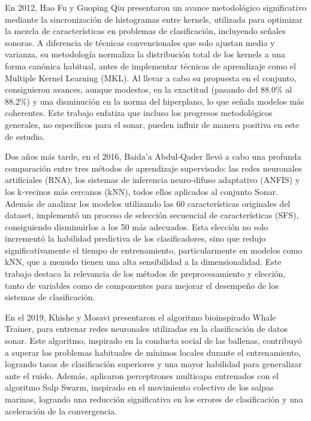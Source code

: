 \documentclass[a4paper,10pt]{article}
\begin{document}
En 2012, Hao Fu y Guoping Qiu presentaron un avance metodológico significativo mediante la sincronización de histogramas entre kernels, utilizada para optimizar la mezcla de características en problemas de clasificación, incluyendo señales sonoras. A diferencia de técnicas convencionales que solo ajustan media y varianza, su metodología normaliza la distribución total de los kernels a una forma canónica habitual, antes de implementar técnicas de aprendizaje como el Multiple Kernel Learning (MKL). Al llevar a cabo su propuesta en el conjunto, consiguieron avances, aunque modestos, en la exactitud (pasando del 88.0\% al 88.2\%) y una disminución en la norma del hiperplano, lo que señala modelos más coherentes. Este trabajo enfatiza que incluso los progresos metodológicos generales, no específicos para el sonar, pueden influir de manera positiva en este de estudio. \cite{fu2012}

\newpage
Dos años más tarde, en el 2016, Baida’a Abdul-Qader llevó a cabo una profunda comparación entre tres métodos de aprendizaje supervisado: las redes neuronales artificiales (RNA), los sistemas de inferencia neuro-difuso adaptativo (ANFIS) y los k-vecinos más cercanos (kNN), todos ellos aplicados al conjunto Sonar. Además de analizar los modelos utilizando las 60 características originales del dataset, implementó un proceso de selección secuencial de características (SFS), consiguiendo disminuirlos a los 50 más adecuados. Esta elección no solo incrementó la habilidad predictiva de los clasificadores, sino que redujo significativamente el tiempo de entrenamiento, particularmente en modelos como kNN, que a menudo tienen una alta sensibilidad a la dimensionalidad. Este trabajo destaca la relevancia de los métodos de preprocesamiento y elección, tanto de variables como de componentes para mejorar el desempeño de los sistemas de clasificación. \cite{abdulqader2016}

En el 2019, Khishe y Mosavi presentaron el algoritmo bioinspirado Whale Trainer, para entrenar redes neuronales utilizadas en la clasificación de datos sonar. Este algoritmo, inspirado en la conducta social de las ballenas, contribuyó a superar los problemas habituales de mínimos locales durante el entrenamiento, logrando tasas de clasificación superiores y una mayor habilidad para generalizar ante el ruido. Además, aplicaron perceptrones multicapa entrenados con el algoritmo Salp Swarm, inspirado en el movimiento colectivo de los salpas marinas, logrando una reducción significativa en los errores de clasificación y una aceleración de la convergencia.\cite{khishe2019whale} \cite{khishe2019salp}
\end{document}
